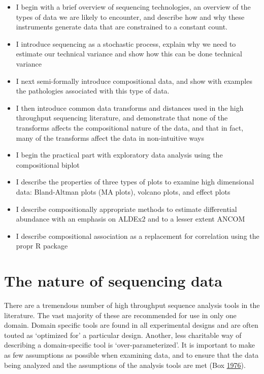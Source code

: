 \documentclass[onecolumn]{book}
\providecommand{\tightlist}{%
  \setlength{\itemsep}{0pt}\setlength{\parskip}{0pt}}
\theoremstyle{definition}
\theoremstyle{definition}
\theoremstyle{definition}
\theoremstyle{remark}
\begin{document}
\begin{itemize}
\tightlist
\item
  I begin with a brief overview of sequencing technologies, an overview
  of the types of data we are likely to encounter, and describe how and
  why these instruments generate data that are constrained to a constant
  count.
\item
  I introduce sequencing as a stochastic process, explain why we need to
  estimate our technical variance and show how this can be done
  technical variance
\item
  I next semi-formally introduce compositional data, and show with
  examples the pathologies associated with this type of data.
\item
  I then introduce common data transforms and distances used in the high
  throughput sequencing literature, and demonstrate that none of the
  transforms affects the compositional nature of the data, and that in
  fact, many of the transforms affect the data in non-intuitive ways
\item
  I begin the practical part with exploratory data analysis using the
  compositional biplot
\item
  I describe the properties of three types of plots to examine high
  dimensional data: Bland-Altman plots (MA plots), volcano plots, and
  effect plots
\item
  I describe compositionally appropriate methods to estimate
  differential abundance with an emphasis on ALDEx2 and to a lesser
  extent ANCOM
\item
  I describe compositional association as a replacement for correlation
  using the propr R package
\end{itemize}

\hypertarget{sequencing}{%
\chapter{The nature of sequencing data}\label{sequencing}}

There are a tremendous number of high throughput sequence analysis tools
in the literature. The vast majority of these are recommended for use in
only one domain. Domain specific tools are found in all experimental
designs and are often touted as `optimized for' a particular design.
Another, less charitable way of describing a domain-specific tool is
`over-parameterized'. It is important to make as few assumptions as
possible when examining data, and to ensure that the data being analyzed
and the assumptions of the analysis tools are met (Box
\protect\hyperlink{ref-box:1976}{1976}).
\end{document}
